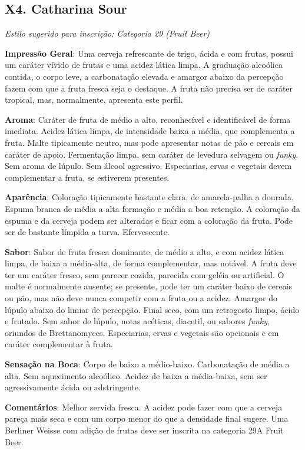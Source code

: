 \subsection*{X4. Catharina Sour}

\textit{Estilo sugerido para inscrição: Categoria 29 (Fruit Beer)}

\textbf{Impressão Geral}: Uma cerveja refrescante de trigo, ácida e com frutas, possui um caráter vívido de frutas e uma acidez lática limpa. A graduação alcoólica contida, o corpo leve, a carbonatação elevada e amargor abaixo da percepção fazem com que a fruta fresca seja o destaque. A fruta não precisa ser de caráter tropical, mas, normalmente, apresenta este perfil.

\textbf{Aroma}: Caráter de fruta de médio a alto, reconhecível e identificável de forma imediata. Acidez lática limpa, de intensidade baixa a média, que complementa a fruta. Malte tipicamente neutro, mas pode apresentar notas de pão e cereais em caráter de apoio. Fermentação limpa, sem caráter de levedura selvagem ou \textit{funky}. Sem aroma de lúpulo. Sem álcool agressivo. Especiarias, ervas e vegetais devem complementar a fruta, se estiverem presentes.

\textbf{Aparência}: Coloração tipicamente bastante clara, de amarela-palha a dourada. Espuma branca de média a alta formação e média a boa retenção. A coloração da espuma e da cerveja podem ser alteradas e ficar com a coloração da fruta. Pode ser de bastante límpida a turva. Efervescente.

\textbf{Sabor}: Sabor de fruta fresca dominante, de médio a alto, e com acidez lática limpa, de baixa a média-alta, de forma complementar, mas notável. A fruta deve ter um caráter fresco, sem parecer cozida, parecida com geléia ou artificial. O malte é normalmente ausente; se presente, pode ter um caráter baixo de cereais ou pão, mas não deve nunca competir com a fruta ou a acidez. Amargor do lúpulo abaixo do limiar de percepção. Final seco, com um retrogosto limpo, ácido e frutado. Sem sabor de lúpulo, notas acéticas, diacetil, ou sabores \textit{funky}, oriundos de Brettanomyces. Especiarias, ervas e vegetais são opcionais e em caráter complementar à fruta.

\textbf{Sensação na Boca}: Corpo de baixo a médio-baixo. Carbonatação de média a alta. Sem aquecimento alcoólico. Acidez de baixa a média-baixa, sem ser agressivamente ácida ou adstringente.

\textbf{Comentários}: Melhor servida fresca. A acidez pode fazer com que a cerveja pareça mais seca e com um corpo menor do que a densidade final sugere. Uma Berliner Weisse com adição de frutas deve ser inscrita na categoria 29A Fruit Beer.

